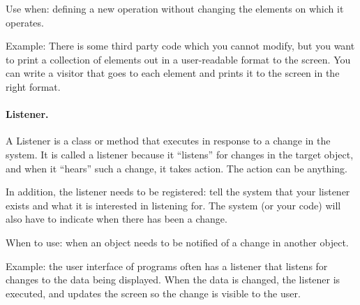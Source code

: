 Use when: defining a new operation without changing the elements on which it operates.

Example: There is some third party code which you cannot modify, but you want to print a collection of elements out in a user-readable format to the screen. You can write a visitor that goes to each element and prints it to the screen in the right format. 

\paragraph{Listener.}
A Listener is a class or method that executes in response to a change in the system. It is called a listener because it ``listens'' for changes in the target object, and when it ``hears'' such a change, it takes action. The action can be anything.

In addition, the listener needs to be registered: tell the system that your listener exists and what it is interested in listening for. The system (or your code) will also have to indicate when there has been a change.

When to use: when an object needs to be notified of a change in another object.

Example: the user interface of programs often has a listener that listens for changes to the data being displayed. When the data is changed, the listener is executed, and updates the screen so the change is visible to the user.





